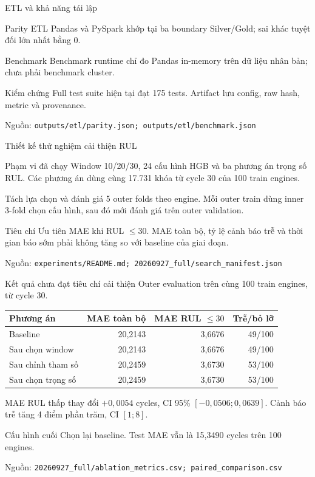 \documentclass[aspectratio=169,professionalfonts]{beamer}
\newcommand{\source}[1]{\vfill\hspace{0pt}\scriptsize\color{muted}Nguồn: \nolinkurl{#1}}
\begin{document}
\begin{frame}{ETL và khả năng tái lập}
\begin{block}{Parity ETL}
Pandas và PySpark khớp tại ba boundary Silver/Gold; sai khác tuyệt đối lớn nhất bằng 0.
\end{block}

\begin{block}{Benchmark}
Benchmark runtime chỉ đo Pandas in-memory trên dữ liệu nhân bản; chưa phải benchmark cluster.
\end{block}

\begin{block}{Kiểm chứng}
Full test suite hiện tại đạt 175 tests. Artifact lưu config, raw hash, metric và provenance.
\end{block}
\source{outputs/etl/parity.json; outputs/etl/benchmark.json}
\end{frame}


\begin{frame}{Thiết kế thử nghiệm cải thiện RUL}
\begin{block}{Phạm vi đã chạy}
Window 10/20/30, 24 cấu hình HGB và ba phương án trọng số RUL.
Các phương án dùng cùng 17.731 khóa từ cycle 30 của 100 train engines.
\end{block}
\begin{block}{Tách lựa chọn và đánh giá}
5 outer folds theo engine. Mỗi outer train dùng inner 3-fold chọn cấu hình,
sau đó mới đánh giá trên outer validation.
\end{block}
\begin{block}{Tiêu chí}
Ưu tiên MAE khi RUL $\leq30$. MAE toàn bộ, tỷ lệ cảnh báo trễ và thời gian
báo sớm phải không tăng so với baseline của giai đoạn.
\end{block}
\source{experiments/README.md; 20260927_full/search_manifest.json}
\end{frame}

\begin{frame}{Kết quả chưa đạt tiêu chí cải thiện}
\small
Outer evaluation trên cùng 100 train engines, từ cycle 30.
\begin{table}
\centering\small
\begin{tabular}{lrrr}
\toprule
Phương án & MAE toàn bộ & MAE RUL $\leq30$ & Trễ/bỏ lỡ\\
\midrule
Baseline & 20,2143 & 3,6676 & 49/100\\
Sau chọn window & 20,2143 & 3,6676 & 49/100\\
Sau chỉnh tham số & 20,2459 & 3,6730 & 53/100\\
Sau chọn trọng số & 20,2459 & 3,6730 & 53/100\\
\bottomrule
\end{tabular}
\end{table}
MAE RUL thấp thay đổi $+0{,}0054$ cycles, CI 95\%
$[-0{,}0506;0{,}0639]$. Cảnh báo trễ tăng 4 điểm phần trăm, CI $[1;8]$.
\begin{block}{Cấu hình cuối}
Chọn lại baseline. Test MAE vẫn là 15,3490 cycles trên 100 engines.
\end{block}
\source{20260927_full/ablation_metrics.csv; paired_comparison.csv}
\end{frame}
\end{document}
